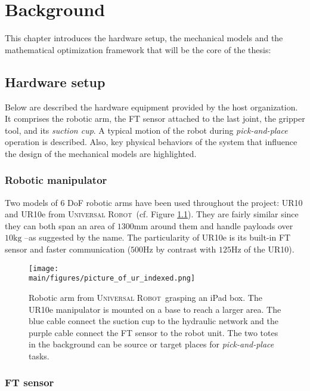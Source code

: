 \documentclass[/home/francois/latex/report/main.tex]{subfiles}
\begin{document}
\chapter{Background}
\label{chapter:background}

This chapter introduces the hardware setup, the mechanical models and the mathematical optimization framework that will be the core of the thesis:

\section{Hardware setup}
\label{section:hardware}

Below are described the hardware equipment provided by the host organization. It comprises the robotic arm, the \ac{FT} sensor attached to the last joint, the gripper tool, and its \textit{suction cup}. A typical motion of the robot during \textit{pick-and-place} operation is described. Also, key physical behaviors of the system that influence the design of the mechanical models are highlighted.

\subsection{Robotic manipulator}

Two models of 6 \ac{DoF} robotic arms have been used throughout the project: UR10 and UR10e from \textsc{Universal Robot}\texttrademark \ (cf. Figure \ref{fig:background:stanislaw}). They are fairly similar since they can both span an area of $1300 \si{\milli\meter}$ around them and handle payloads over $10 \si{\kilo\gram}$ –as suggested by the name. The particularity of UR10e is its built-in \ac{FT} sensor and faster communication ($500 \si{\hertz}$ by contrast with $125 \si{\hertz}$ of the UR10).

\begin{figure}[h]
  \centering
  \texttt{[image: \\main/figures/picture\_of\_ur\_indexed.png]}
  \caption{Robotic arm from \textsc{Universal Robot}\texttrademark \ grasping an iPad box. The UR10e manipulator is mounted on a base to reach a larger area. The blue cable connect the suction cup to the hydraulic network and the purple cable connect the \ac{FT} sensor to the robot unit. The two totes in the background can be source or target places for \textit{pick-and-place} tasks.}
  \label{fig:background:stanislaw}
\end{figure}

\subsection{\ac{FT} sensor}
\end{document}
